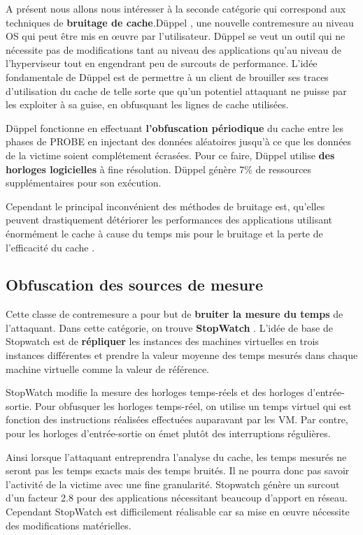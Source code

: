 A présent nous allons nous intéresser à la seconde catégorie qui correspond aux techniques de \textbf{ bruitage de cache}.Düppel \cite{duppel}, une nouvelle contremesure au niveau OS  qui  peut être mis en œuvre par l’utilisateur. Düppel se veut un outil qui ne nécessite pas de modifications tant au niveau des applications qu’au niveau de l’hyperviseur tout en engendrant peu de surcouts de performance.  L’idée fondamentale de Düppel est de permettre à un client de brouiller ses traces d’utilisation du cache de telle sorte que  qu’un potentiel attaquant ne puisse par les exploiter à sa guise, en obfusquant  les lignes de cache utilisées. \par Düppel fonctionne en effectuant \textbf{ l’obfuscation périodique} du cache entre les phases de PROBE en injectant des données aléatoires jusqu’à ce que les données de la victime soient complétement écrasées. Pour ce faire, Düppel utilise \textbf{ des horloges logicielles} à fine résolution.  Düppel génère 7\% de ressources supplémentaires pour son exécution. \par
Cependant le principal inconvénient des méthodes de bruitage est, qu’elles peuvent drastiquement  détériorer les performances des applications utilisant énormément le cache à cause du temps mis pour le bruitage et la perte de l’efficacité du cache \cite{Ristenpart}.

\subsection{Obfuscation des sources de mesure}					

Cette classe de contremesure a pour but de \textbf{bruiter la mesure du temps} de l’attaquant. Dans cette catégorie, on trouve \textbf{StopWatch} \cite{StopWatch}.  L’idée de base de Stopwatch est de \textbf{ répliquer} les instances des machines virtuelles en trois instances différentes et prendre la valeur moyenne des  temps  mesurés dans chaque machine virtuelle comme la valeur de référence. 
\par  StopWatch modifie la mesure des horloges temps-réels et des horloges d’entrée-sortie. Pour obfusquer les horloges temps-réel,  on utilise un temps virtuel qui est fonction des instructions réalisées effectuées auparavant par les VM. Par contre, pour les horloges d’entrée-sortie on émet  plutôt des  interruptions régulières. 
\par Ainsi lorsque l’attaquant entreprendra l’analyse du cache, les temps mesurés ne seront pas les temps exacts mais des temps bruités. Il ne pourra donc pas  savoir l’activité de la victime avec une fine granularité. Stopwatch génère un surcout d'un facteur 2.8 pour des applications nécessitant beaucoup d’apport en réseau. Cependant StopWatch est difficilement réalisable car  sa mise en œuvre nécessite des modifications matérielles. \newline{}

